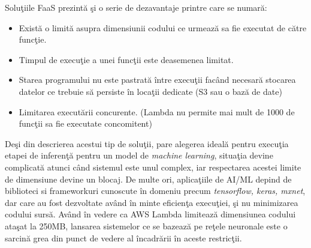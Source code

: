 \documentclass[a4paper,12pt]{report}
\begin{document}
Soluţiile FaaS prezintă şi o serie de dezavantaje printre care se numară:
\begin{itemize} 
\item Există o limită asupra dimensiunii codului ce urmează sa fie executat de către funcţie.
\item Timpul de execuţie a unei funcţii este deasemenea limitat.
\item Starea programului nu este pastrată între execuţii facând necesară stocarea datelor ce trebuie să persiste în locaţii dedicate (S3 sau o bază de date)
\item Limitarea executării concurente. (Lambda nu permite mai mult de 1000 de funcţii sa fie executate concomitent)
\end{itemize} 
\par Deşi din descrierea acestui tip de soluţii, pare alegerea ideală pentru execuţia etapei de inferenţă pentru un model de \emph{machine learning}, situaţia devine complicată atunci când sistemul este unul complex, iar respectarea acestei limite de dimensiune devine un blocaj. De multe ori, aplicaţiile de AI/ML depind de biblioteci si frameworkuri cunoscute în domeniu precum \emph{ tensorflow, keras, mxnet}, dar care au fost dezvoltate având în minte eficienţa execuţiei, şi nu minimizarea codului sursă. Având în vedere ca AWS Lambda limitează dimensiunea codului ataşat la 250MB, lansarea sistemelor ce se bazează pe reţele neuronale este o sarcină grea din punct de vedere al încadrării în aceste restricţii. 
\end{document}
